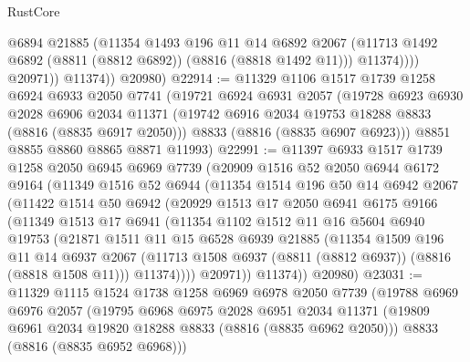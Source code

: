 \begin{lexlean}{RustCore}
\begin{coremodule}
                    @6894
                    @21885
                    (@11354
                      @1493
                      @196
                      @11
                      @14
                      @6892
                      @2067
                      (@11713 @1492 @6892 (@8811 (@8812 @6892)) (@8816 (@8818 @1492 @11)))
                      @11374))))
              @20971))
          @11374))
      @20980)
@22914 := @11329
    @1106
    @1517
    @1739
    @1258
    @6924
    @6933
    @2050
    @7741
    (@19721
      @6924
      @6931
      @2057
      (@19728
        @6923
        @6930
        @2028
        @6906
        @2034
        @11371
        (@19742 @6916 @2034 @19753 @18288 @8833 (@8816 (@8835 @6917 @2050)))
        @8833
        (@8816 (@8835 @6907 @6923)))
      @8851
      @8855
      @8860
      @8865
      @8871
      @11993)
@22991 := @11397
    @6933
    @1517
    @1739
    @1258
    @2050
    @6945
    @6969
    @7739
    (@20909
      @1516
      @52
      @2050
      @6944
      @6172
      @9164
      (@11349
        @1516
        @52
        @6944
        (@11354
          @1514
          @196
          @50
          @14
          @6942
          @2067
          (@11422
            @1514
            @50
            @6942
            (@20929
              @1513
              @17
              @2050
              @6941
              @6175
              @9166
              (@11349
                @1513
                @17
                @6941
                (@11354
                  @1102
                  @1512
                  @11
                  @16
                  @5604
                  @6940
                  @19753
                  (@21871
                    @1511
                    @11
                    @15
                    @6528
                    @6939
                    @21885
                    (@11354
                      @1509
                      @196
                      @11
                      @14
                      @6937
                      @2067
                      (@11713 @1508 @6937 (@8811 (@8812 @6937)) (@8816 (@8818 @1508 @11)))
                      @11374))))
              @20971))
          @11374))
      @20980)
@23031 := @11329
    @1115
    @1524
    @1738
    @1258
    @6969
    @6978
    @2050
    @7739
    (@19788
      @6969
      @6976
      @2057
      (@19795
        @6968
        @6975
        @2028
        @6951
        @2034
        @11371
        (@19809 @6961 @2034 @19820 @18288 @8833 (@8816 (@8835 @6962 @2050)))
        @8833
        (@8816 (@8835 @6952 @6968)))

\end{coremodule}
\end{lexlean}
